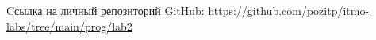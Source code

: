 \begin{thebibliography}{}
     Cсылка на личный репозиторий GitHub: \url{https://github.com/pozitp/itmo-labs/tree/main/prog/lab2}\\
\end{thebibliography}